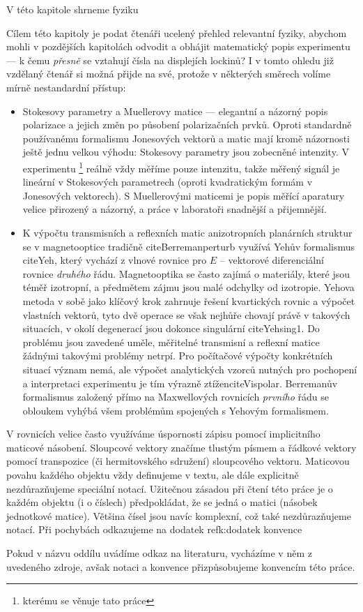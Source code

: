 V této kapitole shrneme fyziku

\oddelovac 

Cílem této kapitoly je podat čtenáři ucelený přehled relevantní fyziky, abychom mohli v pozdějších kapitolách odvodit a obhájit matematický popis experimentu --- k čemu \emph{přesně} se vztahují čísla na displejích lockinů?
I v tomto ohledu již vzdělaný čtenář si možná přijde na své, protože v některých směrech volíme mírně nestandardní přístup:

\begin{itemize}
\item
Stokesovy parametry a Muellerovy matice --- elegantní a názorný popis polarizace a jejich změn po působení polarizačních prvků.
Oproti standardně používanému formalismu Jonesových vektorů a matic mají kromě názornosti ještě jednu velkou výhodu: Stokesovy parametry jsou zobecněné intenzity.
V experimentu \footnote{kterému se věnuje tato práce} reálně vždy měříme pouze intenzitu, takže měřený signál je lineární v Stokesových parametrech (oproti kvadratickým formám v Jonesových vektorech).
S Muellerovými maticemi je popis měřící aparatury velice přirozený a názorný, a práce v laboratoři snadnější a přijemnější.

\item
K výpočtu transmisních a reflexních matic anizotropních planárních struktur se v magnetooptice tradičně citeBerremanperturb využívá Yehův formalismus citeYeh, který vychází z vlnové rovnice pro $E$ -- vektorové diferenciální rovnice \emph{druhého} řádu.
Magnetooptika se často zajímá o materiály, které jsou téměř izotropní, a předmětem zájmu jsou malé odchylky od izotropie.
Yehova metoda v sobě jako klíčový krok zahrnuje řešení kvartických rovnic a výpočet vlastních vektorů, tyto dvě operace se však nejhůře chovají právě v takových situacích, v okolí degenerací jsou dokonce singulární cite{Yehsing1}.
Do problému jsou zavedené uměle, měřitelné transmisní a reflexní matice žádnými takovými problémy netrpí.
Pro počítačové výpočty konkrétních situací význam nemá, ale výpočet analytických vzorců nutných pro pochopení a interpretaci experimentu je tím výrazně ztížencite{Vispolar}.
Berremanův formalismus založený přímo na Maxwellových rovnicích \emph{prvního} řádu se obloukem vyhýbá všem problémům spojených s Yehovým formalismem.
\end{itemize}

V rovnicích velice často využíváme úspornosti zápisu pomocí implicitního maticové násobení.
Sloupcové vektory značíme tlustým písmem a řádkové vektory pomocí transpozice (či hermitovského sdružení) sloupcového vektoru.
Maticovou povahu každého objektu vždy definujeme v textu, ale dále explicitně nezdůrazňujeme speciální notací.
Užitečnou zásadou při čtení této práce je o každém objektu (i o číslech) předpokládat, že se jedná o matici (násobek jednotkové matice).
Většina čísel jsou navíc komplexní, což také nezdůrazňujeme notací.
Při pochybách odkazujeme na dodatek refk:dodatek konvence

Pokud v názvu oddílu uvádíme odkaz na literaturu, vycházíme v něm z uvedeného zdroje, avšak notaci a konvence přizpůsobujeme konvencím této práce.
